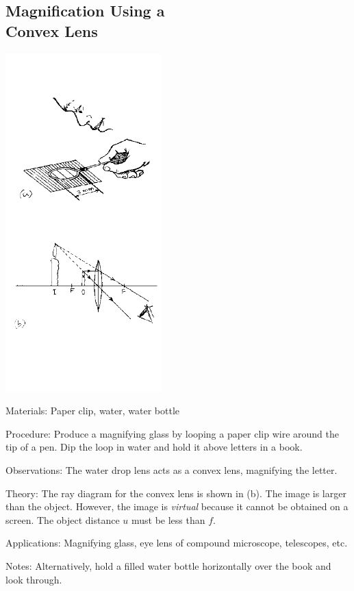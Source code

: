 \begin{multicols}{2}
\subsection[Magnification Using a Convex Lens]{Magnification Using a \hfill \\ Convex Lens}

\begin{center}
\includegraphics[width=0.45\textwidth]{./img/source/magnification-convex.png}
\end{center}

\begin{description*}
\item[Materials:]{Paper clip, water, water bottle}
\item[Procedure:]{Produce a magnifying glass by looping a paper clip wire around the tip of a pen. Dip the loop in water and hold it above letters in a book.}
\item[Observations:]{The water drop lens acts as a convex lens, magnifying the letter.}
\item[Theory:]{The ray diagram for the convex lens is shown in (b). The image is larger than the object. However, the image is \emph{virtual} because it cannot be obtained on a screen. The object distance $u$ must be less than $f$.}
\item[Applications:]{Magnifying glass, eye lens of compound microscope, telescopes, etc.}
\item[Notes:]{Alternatively, hold a filled water bottle horizontally over the book and look through.}
\end{description*}


\end{multicols}
